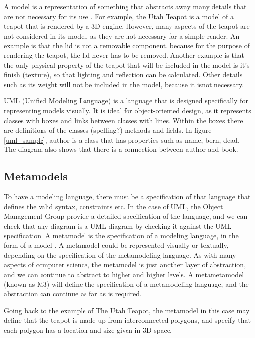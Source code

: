 A model is a representation of something that abstracts away many details that are not necessary for its use \citep{brambillaBook}. For example, the Utah Teapot \citep{utahTeapot} is a model of a teapot that is rendered by a 3D engine. However, many aspects of the teapot are not considered in its model, as they are not necessary for a simple render. An example is that the lid is not a removable component, because for the purpose of rendering the teapot, the lid never has to be removed. Another example is that the only physical property of the teapot that will be included in the model is it's finish (texture), so that lighting and reflection can be calculated. Other details such as its weight will not be included in the model, because it isnot necessary.

UML (Unified Modeling Language) is a language that is designed specifically for representing models visually. It is ideal for object-oriented design, as it represents classes with boxes and links between classes with lines. Within the boxes there are definitions of the classes (spelling?) methods and fields. In figure \ref{uml_sample}, author is a class that has properties such as name, born, dead. The diagram also shows that there is a connection between author and book.

\subsection{Metamodels}
To have a modeling language, there must be a specification of that language that defines the valid syntax, constraints etc. In the case of UML, the Object Management Group provide a detailed specification \citep{umlSpec} of the language, and we can check that any diagram is a UML diagram by checking it against the UML specification.
A metamodel is the specification of a modeling language, in the form of a model \citep{brambillaBook}. A metamodel could be represented visually or textually, depending on the specification of the metamodeling language. As with many aspects of computer science, the metamodel is just another layer of abstraction, and we can continue to abstract to higher and higher levels. A metametamodel (known as M3) will define the specification of a metamodeling language, and the abstraction can continue as far as is required.

Going back to the example of The Utah Teapot, the metamodel in this case may define that the teapot is made up from interconnected polygons, and specify that each polygon has a location and size given in 3D space. 

